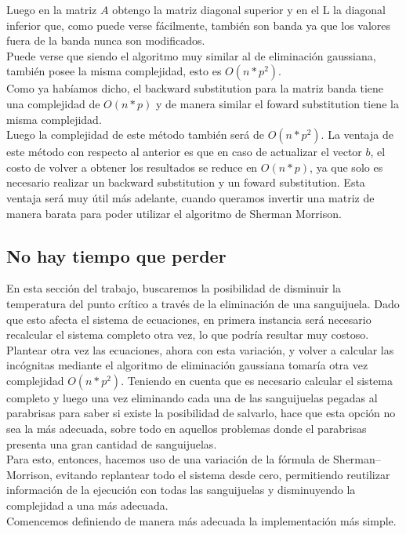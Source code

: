 Luego en la matriz $A$ obtengo la matriz diagonal superior y en el L la diagonal inferior que, como puede verse fácilmente, también son banda ya que los valores fuera de la banda nunca son modificados.
\\
Puede verse que siendo el algoritmo muy similar al de eliminación gaussiana, también posee la misma complejidad, esto es $O(n*p^2)$.
\\
Como ya habíamos dicho, el backward substitution para la matriz banda tiene una complejidad de $O(n*p)$ y de manera similar el foward substitution tiene la misma complejidad.
\\
Luego la complejidad de este método también será de $O(n*p^2)$. La ventaja de este método con respecto al anterior es que en caso de actualizar el vector $b$, el costo de volver a obtener los resultados se reduce en $O(n*p)$, ya que solo es necesario realizar un backward substitution y un foward substitution. Esta ventaja será muy útil más adelante, cuando queramos invertir una matriz de manera barata para poder utilizar el algoritmo de Sherman Morrison.

\subsection{No hay tiempo que perder}

En esta sección del trabajo, buscaremos la posibilidad de disminuir la temperatura del punto crítico a través de la eliminación de una sanguijuela. Dado que esto afecta el sistema de ecuaciones, en primera instancia será necesario recalcular el sistema completo otra vez, lo que podría resultar muy costoso.
\\
Plantear otra vez las ecuaciones, ahora con esta variación, y volver a calcular las incógnitas mediante el algoritmo de eliminación gaussiana tomaría otra vez complejidad $O(n*p^2)$. Teniendo en cuenta que es necesario calcular el sistema completo y luego una vez eliminando cada una de las sanguijuelas pegadas al parabrisas para saber si existe la posibilidad de salvarlo, hace que esta opción no sea la más adecuada, sobre todo en aquellos problemas donde el parabrisas presenta una gran cantidad de sanguijuelas.
\\
Para esto, entonces, hacemos uso de una variación de la fórmula de Sherman–Morrison, evitando replantear todo el sistema desde cero, permitiendo reutilizar información de la ejecución con todas las sanguijuelas y disminuyendo la complejidad a una más adecuada.
\\
Comencemos definiendo de manera más adecuada la implementación más simple.

